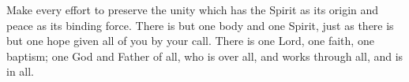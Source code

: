 \lettrine[lines=3]{M}{}ake every effort to preserve the unity which has the Spirit as its origin and peace as its binding force. There is but one body and one Spirit, just as there is but one hope given all of you by your call. There is one Lord, one faith, one baptism; one God and Father of all, who is over all, and works through all, and is in all.
